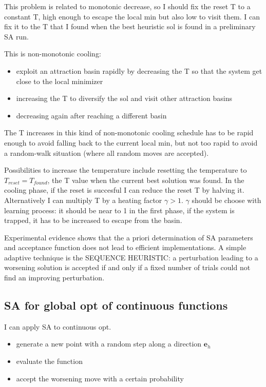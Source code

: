 \documentclass[11pt]{article}
\begin{document}
This problem is related to monotonic decrease, so I should fix the reset T to a constant T, high enough to escape the local min but also low to visit them. I can fix it to the T that I found when the best heuristic sol is found in a preliminary SA run. 

This is non-monotonic cooling:

\begin{itemize}
\item exploit an attraction basin rapidly
by decreasing the T so that the system get close to the local minimizer
\item increasing the
T to diversify the sol and visit other attraction basins
\item decreasing again after reaching a different
basin
\end{itemize}

The T increases in this kind of non-monotonic cooling schedule has to be rapid enough to avoid falling back to the current local min, but not too rapid to avoid a random-walk situation (where all random moves are accepted).

Possibilities to increase the temperature include resetting the temperature to $ T_{reset} = T_{found} $, the T value when the current best solution was found. 
In the cooling phase, if the reset is succesful I can reduce the reset T by halving it.
Alternatively I can multiply T by a heating factor $ \gamma > 1 $. $ \gamma $ should be choose with learning process: it should be near to 1 in the first phase, if the system is trapped, it has to be increased to escape from the basin.

Experimental evidence shows that the a priori determination of SA parameters and acceptance function does not
lead to efficient implementations. A simple adaptive technique is the SEQUENCE HEURISTIC: a perturbation leading to a worsening solution is accepted if and only if a fixed number of trials could not find an improving perturbation.

\subsection{SA for global opt of continuous functions}
I can apply SA to continuous opt. 

\begin{itemize}
\item generate a new point with a random step along a direction $ \textbf{e}_h $
\item evaluate the function
\item accept the worsening move with a certain probability
\end{itemize}
\end{document}
